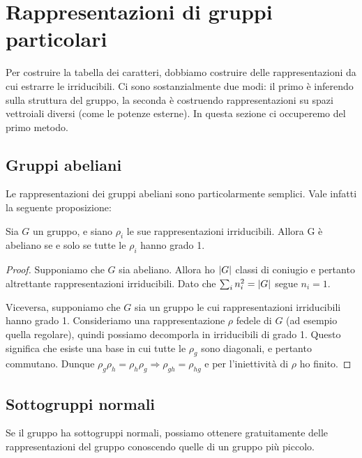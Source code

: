 \section{Rappresentazioni di gruppi particolari}
	Per costruire la tabella dei caratteri, dobbiamo costruire delle rappresentazioni da cui estrarre le irriducibili. Ci sono sostanzialmente due modi: il primo è inferendo sulla struttura del gruppo, la seconda è costruendo rappresentazioni su spazi vettroiali diversi (come le potenze esterne). In questa sezione ci occuperemo del primo metodo.
	
	\subsection{Gruppi abeliani}
		Le rappresentazioni dei gruppi abeliani sono particolarmente semplici. Vale infatti la seguente proposizione:
		\begin{myprop}
			Sia $G$ un gruppo, e siano $\rho_i$ le sue rappresentazioni irriducibili. Allora G è abeliano se e solo se tutte le $\rho_i$ hanno grado 1.
		\end{myprop}
		
		\begin{proof}
			Supponiamo che $G$ sia abeliano. Allora ho $\left|G\right|$ classi di coniugio e pertanto altrettante rappresentazioni irriducibili. Dato che $\sum_i n_i^2 = \left|G\right|$ segue $n_i = 1$.
			
			Viceversa, supponiamo che $G$ sia un gruppo le cui rappresentazioni irriducibili hanno grado 1. Consideriamo una rappresentazione $\rho$ fedele di $G$ (ad esempio quella regolare), quindi possiamo decomporla in irriducibili di grado 1. Questo significa che esiste una base in cui tutte le $\rho_g$ sono diagonali, e pertanto commutano. Dunque $\rho_g\rho_h = \rho_h\rho_g \Rightarrow \rho_{gh} = \rho_{hg}$ e per l'iniettività di $\rho$ ho finito.
		\end{proof}

	\subsection{Sottogruppi normali}
		Se il gruppo ha sottogruppi normali, possiamo ottenere gratuitamente delle rappresentazioni del gruppo conoscendo quelle di un gruppo più piccolo.
		
